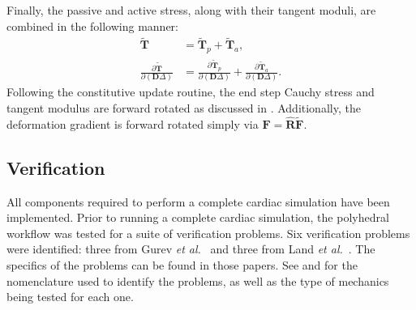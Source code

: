 Finally, the passive and active stress, along with their tangent moduli, are combined in the following manner:
\begin{align}
\tilde{\bm{T}} &= \tilde{\bm{T}}_p + \tilde{\bm{T}}_a, \\
\frac{\partial \tilde{\bm{T}}}{\partial (\bm{D}\Delta)} &= \frac{\partial \tilde{\bm{T}}_p}{\partial (\bm{D}\Delta)}+ \frac{\partial \tilde{\bm{T}}_a}{\partial (\bm{D}\Delta)}.
\end{align}
Following the constitutive update routine, the end step Cauchy stress and tangent modulus are forward rotated as discussed in . Additionally, the deformation gradient is forward rotated simply via $\bm{F} =\hat{\bm{R}}\tilde{\bm{F}}$.


\subsection{Verification}

All components required to perform a complete cardiac simulation have been implemented. Prior to running a complete cardiac simulation, the polyhedral workflow was tested for a suite of verification problems. Six verification problems were identified: three from Gurev \textit{et al.}~\cite{gurev_2015} and three from Land \textit{et al.}~\cite{land_2015}. The specifics of the problems can be found in those papers. See  and  for the nomenclature used to identify the problems, as well as the type of mechanics being tested for each one.

